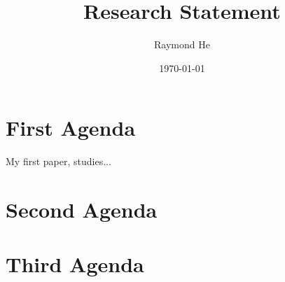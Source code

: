 \documentclass[11pt]{article}
\title{\textbf{Research Statement}}
\author{Raymond He}
\date{\today}
\begin{document}
\maketitle

\noindent

\section{First Agenda}


\noindent
My first paper, studies...

\section{Second Agenda}

\section{Third Agenda}



\end{document}

